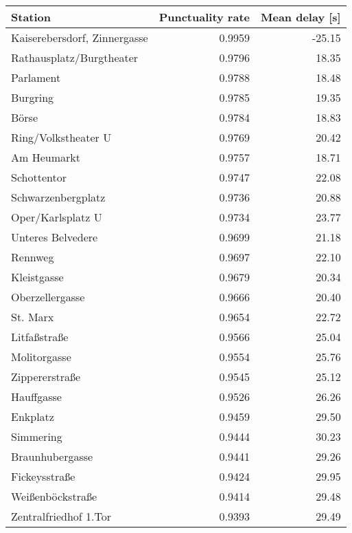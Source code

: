 \begin{table}
	\centering
	\begin{tabular}{lrr}
		\toprule
		Station & Punctuality rate & Mean delay [s] \\
		\midrule
		Kaiserebersdorf, Zinnergasse &    0.9959 & -25.15 \\
		Rathausplatz/Burgtheater     &    0.9796 &  18.35 \\
		Parlament                    &    0.9788 &  18.48 \\
		Burgring                     &    0.9785 &  19.35 \\
		Börse                        &    0.9784 &  18.83 \\
		Ring/Volkstheater U          &    0.9769 &  20.42 \\
		Am Heumarkt                  &    0.9757 &  18.71 \\
		Schottentor                  &    0.9747 &  22.08 \\
		Schwarzenbergplatz           &    0.9736 &  20.88 \\
		Oper/Karlsplatz U            &    0.9734 &  23.77 \\
		Unteres Belvedere            &    0.9699 &  21.18 \\
		Rennweg                      &    0.9697 &  22.10 \\
		Kleistgasse                  &    0.9679 &  20.34 \\
		Oberzellergasse              &    0.9666 &  20.40 \\
		St. Marx                     &    0.9654 &  22.72 \\
		Litfaßstraße                 &    0.9566 &  25.04 \\
		Molitorgasse                 &    0.9554 &  25.76 \\
		Zippererstraße               &    0.9545 &  25.12 \\
		Hauffgasse                   &    0.9526 &  26.26 \\
		Enkplatz                     &    0.9459 &  29.50 \\
		Simmering                    &    0.9444 &  30.23 \\
		Braunhubergasse              &    0.9441 &  29.26 \\
		Fickeysstraße                &    0.9424 &  29.95 \\
		Weißenböckstraße             &    0.9414 &  29.48 \\
		Zentralfriedhof 1.Tor        &    0.9393 &  29.49 \\

\end{tabular}
\end{table}
